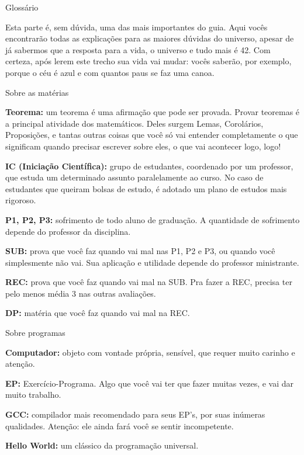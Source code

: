 \begin{secao}{Glossário}

Esta parte é, sem dúvida, uma das mais importantes do guia. Aqui vocês
encontrarão todas as explicações para as maiores dúvidas do universo, apesar de
já sabermos que a resposta para a vida, o universo e tudo mais é 42. Com
certeza, após lerem este trecho sua vida vai mudar: vocês saberão, por exemplo,
porque o céu é azul e com quantos paus se faz uma canoa.

\begin{subsecao}{Sobre as matérias}

{\bf Teorema:} um teorema é uma afirmação que pode ser provada. Provar
teoremas é a principal atividade dos matemáticos. Deles surgem Lemas,
Corolários, Proposições, e tantas outras coisas que você só vai entender
completamente o que significam quando precisar escrever sobre eles, o que vai
acontecer logo, logo!

{\bf IC (Iniciação Científica):} grupo de estudantes, coordenado por um
professor, que estuda um determinado assunto paralelamente ao curso. No caso de
estudantes que queiram bolsas de estudo, é adotado um plano de estudos mais
rigoroso.

{\bf P1, P2, P3:} sofrimento de todo aluno de graduação. A quantidade de
sofrimento depende do professor da disciplina.

{\bf SUB:} prova que você faz quando vai mal nas P1, P2 e P3, ou quando você
simplesmente não vai. Sua aplicação e utilidade depende do professor
ministrante.

{\bf REC:} prova que você faz quando vai mal na SUB. Pra fazer a REC, precisa
ter pelo menos média 3 nas outras avaliações.

{\bf DP:} matéria que você faz quando vai mal na REC.
\end{subsecao}

\begin{subsecao}{Sobre programas}

{\bf Computador:} objeto com vontade própria, sensível, que requer muito
carinho e atenção.

{\bf EP:} Exercício-Programa. Algo que você vai ter que fazer muitas vezes, e
vai dar muito trabalho.

{\bf GCC:} compilador mais recomendado para seus EP's, por suas inúmeras
qualidades. Atenção: ele ainda fará você se sentir incompetente.

{\bf Hello World:} um clássico da programação universal.


\end{subsecao}
\end{secao}
